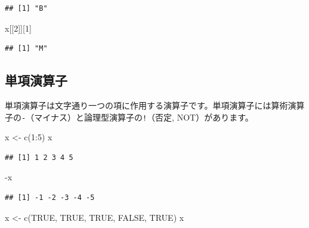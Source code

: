 \documentclass[
  12pt,
]{book}
\newenvironment{Shaded}{\begin{snugshade}}{\end{snugshade}}
\newcommand{\ConstantTok}[1]{\textcolor[rgb]{0.00,0.00,0.00}{#1}}
\newcommand{\DecValTok}[1]{\textcolor[rgb]{0.00,0.00,0.81}{#1}}
\newcommand{\FunctionTok}[1]{\textcolor[rgb]{0.00,0.00,0.00}{#1}}
\newcommand{\NormalTok}[1]{#1}
\newcommand{\OtherTok}[1]{\textcolor[rgb]{0.56,0.35,0.01}{#1}}
\newcommand{\SpecialCharTok}[1]{\textcolor[rgb]{0.00,0.00,0.00}{#1}}
\begin{document}
\begin{verbatim}
## [1] "B"
\end{verbatim}

\begin{Shaded}
\begin{Highlighting}[]
\NormalTok{x[[}\DecValTok{2}\NormalTok{]][}\DecValTok{1}\NormalTok{]}
\end{Highlighting}
\end{Shaded}

\begin{verbatim}
## [1] "M"
\end{verbatim}

\hypertarget{ux5358ux9805ux6f14ux7b97ux5b50}{%
\subsection{単項演算子}\label{ux5358ux9805ux6f14ux7b97ux5b50}}

単項演算子は文字通り一つの項に作用する演算子です。単項演算子には算術演算子の\texttt{-}（マイナス）と論理型演算子の\texttt{!}（否定, NOT）があります。

\begin{Shaded}
\begin{Highlighting}[]
\NormalTok{x }\OtherTok{\textless{}{-}} \FunctionTok{c}\NormalTok{(}\DecValTok{1}\SpecialCharTok{:}\DecValTok{5}\NormalTok{)}
\NormalTok{x}
\end{Highlighting}
\end{Shaded}

\begin{verbatim}
## [1] 1 2 3 4 5
\end{verbatim}

\begin{Shaded}
\begin{Highlighting}[]
\SpecialCharTok{{-}}\NormalTok{x}
\end{Highlighting}
\end{Shaded}

\begin{verbatim}
## [1] -1 -2 -3 -4 -5
\end{verbatim}

\begin{Shaded}
\begin{Highlighting}[]
\NormalTok{x }\OtherTok{\textless{}{-}} \FunctionTok{c}\NormalTok{(}\ConstantTok{TRUE}\NormalTok{, }\ConstantTok{TRUE}\NormalTok{, }\ConstantTok{TRUE}\NormalTok{, }\ConstantTok{FALSE}\NormalTok{, }\ConstantTok{TRUE}\NormalTok{)}
\NormalTok{x}
\end{Highlighting}
\end{Shaded}
\end{document}
